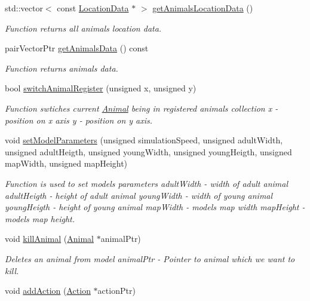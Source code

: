 \begin{DoxyCompactItemize}
std\+::vector$<$ const \hyperlink{struct_location_data}{Location\+Data} $\ast$ $>$ \hyperlink{class_model_a595350e16f19c49951506c05e0c2f5fd}{get\+Animals\+Location\+Data} ()
\begin{DoxyCompactList}\small\item\em Function returns all animals location data. \end{DoxyCompactList}\item 
pair\+Vector\+Ptr \hyperlink{class_model_a851cf88c236cfa584eee39a8cb554650}{get\+Animals\+Data} () const 
\begin{DoxyCompactList}\small\item\em Function returns animals data. \end{DoxyCompactList}\item 
bool \hyperlink{class_model_aa584d00faea00084c10d9f07d2f6e4fc}{switch\+Animal\+Register} (unsigned x, unsigned y)
\begin{DoxyCompactList}\small\item\em Function swtiches current \hyperlink{class_animal}{Animal} being in registered animals collection  x -\/ position on x axis  y -\/ position on y axis. \end{DoxyCompactList}\item 
void \hyperlink{class_model_a561a1b5d0e5b17d60309a0bd1bbfffed}{set\+Model\+Parameters} (unsigned simulation\+Speed, unsigned adult\+Width, unsigned adult\+Heigth, unsigned young\+Width, unsigned young\+Heigth, unsigned map\+Width, unsigned map\+Height)
\begin{DoxyCompactList}\small\item\em Function is used to set model\textquotesingle{}s parameters  adult\+Width -\/ width of adult animal  adult\+Heigth -\/ height of adult animal  young\+Width -\/ width of young animal  young\+Heigth -\/ height of young animal  map\+Width -\/ model\textquotesingle{}s map width  map\+Height -\/ model\textquotesingle{}s map height. \end{DoxyCompactList}\item 
void \hyperlink{class_model_a5912db62a8f99275b77908e65d76bf14}{kill\+Animal} (\hyperlink{class_animal}{Animal} $\ast$animal\+Ptr)
\begin{DoxyCompactList}\small\item\em Deletes an animal from model  animal\+Ptr -\/ Pointer to animal which we want to kill. \end{DoxyCompactList}\item 
void \hyperlink{class_model_a68c3f86c7ff37da667d5944e03c5d3ea}{add\+Action} (\hyperlink{class_action}{Action} $\ast$action\+Ptr)

\end{DoxyCompactItemize}
